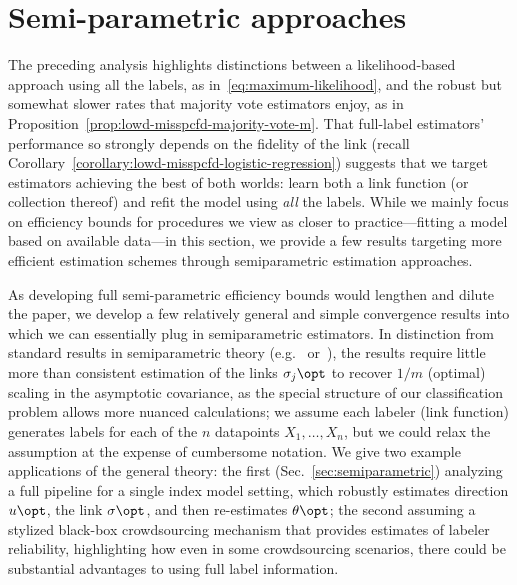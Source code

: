 
\providecommand{\lipconst}{\mathsf{L}}
\newcommand{\uinit}{u_n^{\textup{init}}}
\newcommand{\uerror}{\epsilon}

\section{Semi-parametric approaches}
\label{sec:semi-param}

The preceding analysis highlights distinctions between a
likelihood-based approach using all the labels, as
in~\eqref{eq:maximum-likelihood}, and the robust but somewhat slower rates
that majority vote estimators enjoy, as in
Proposition~\ref{prop:lowd-misspcfd-majority-vote-m}.  That full-label
estimators' performance so strongly depends on the fidelity of the link
(recall Corollary~\ref{corollary:lowd-misspcfd-logistic-regression})
suggests that we target estimators achieving the best of both worlds: learn
both a link function (or collection thereof) and refit the model using
\emph{all} the labels. While we mainly focus on efficiency bounds for
procedures we view as closer to practice---fitting a model based on
available data---in this section, we provide a few results targeting more
efficient estimation schemes through semiparametric estimation approaches.

As developing full semi-parametric efficiency bounds would
lengthen and dilute the paper, we develop a few relatively general and
simple convergence results into which we can essentially plug in
semiparametric estimators. In distinction from standard results in
semiparametric theory (e.g.~\cite[Ch.~25]{VanDerVaart98}
or~\cite{BickelKlRiWe98}), the results require little more than consistent
estimation of the links $\sigma_j\opt$ to recover $1/m$ (optimal) scaling in
the asymptotic covariance, as the special structure of our classification
problem allows more nuanced calculations; we assume each labeler (link
function) generates labels for each of the $n$ datapoints $X_1, \ldots,
X_n$, but we could relax the assumption at the expense of
cumbersome notation.  We give two example applications of the general
theory: the first (Sec.~\ref{sec:semiparametric}) analyzing a full pipeline
for a single index model setting, which robustly estimates direction $u\opt$,
the link $\sigma\opt$, and then re-estimates $\theta\opt$; the second
assuming a stylized black-box crowdsourcing mechanism that provides
estimates of labeler reliability, highlighting how even in some
crowdsourcing scenarios, there could be substantial advantages to using full
label information.

